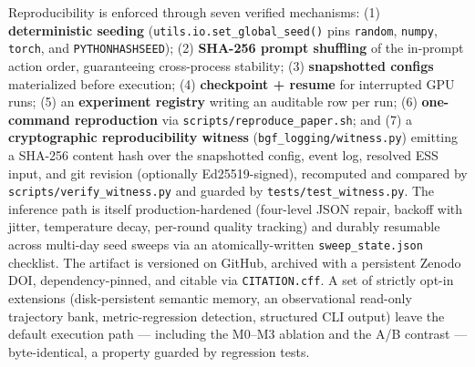 Reproducibility is enforced through seven verified mechanisms: (1) \textbf{deterministic seeding} (\texttt{utils.io.set\_global\_seed()} pins \texttt{random}, \texttt{numpy}, \texttt{torch}, and \texttt{PYTHONHASHSEED}); (2) \textbf{SHA-256 prompt shuffling} of the in-prompt action order, guaranteeing cross-process stability; (3) \textbf{snapshotted configs} materialized before execution; (4) \textbf{checkpoint + resume} for interrupted GPU runs; (5) an \textbf{experiment registry} writing an auditable row per run; (6) \textbf{one-command reproduction} via \texttt{scripts/reproduce\_paper.sh}; and (7) a \textbf{cryptographic reproducibility witness} (\texttt{bgf\_logging/witness.py}) emitting a SHA-256 content hash over the snapshotted config, event log, resolved ESS input, and git revision (optionally Ed25519-signed), recomputed and compared by \texttt{scripts/verify\_witness.py} and guarded by \texttt{tests/test\_witness.py}. The inference path is itself production-hardened (four-level JSON repair, backoff with jitter, temperature decay, per-round quality tracking) and durably resumable across multi-day seed sweeps via an atomically-written \texttt{sweep\_state.json} checklist. The artifact is versioned on GitHub, archived with a persistent Zenodo DOI, dependency-pinned, and citable via \texttt{CITATION.cff}. A set of strictly opt-in extensions (disk-persistent semantic memory, an observational read-only trajectory bank, metric-regression detection, structured CLI output) leave the default execution path — including the M0–M3 ablation and the A/B contrast — byte-identical, a property guarded by regression tests.

